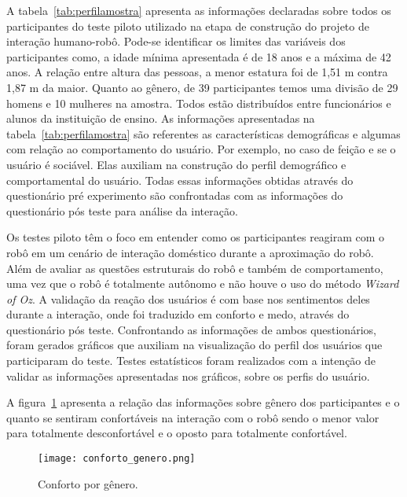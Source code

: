 A tabela~\ref{tab:perfilamostra} apresenta as informações declaradas sobre todos os participantes do teste piloto utilizado na etapa de construção do projeto de interação humano-robô. Pode-se identificar os limites das variáveis dos participantes como, a idade mínima apresentada é de 18 anos e a máxima de 42 anos. A relação entre altura das pessoas, a menor estatura foi de 1,51 m contra 1,87 m da maior. Quanto ao gênero, de 39 participantes temos uma divisão de 29 homens e 10 mulheres na amostra. Todos estão distribuídos entre funcionários e alunos da instituição de ensino. As informações apresentadas na tabela~\ref{tab:perfilamostra} são referentes as características demográficas e algumas com relação ao comportamento do usuário. Por exemplo, no caso de feição e se o usuário é sociável. Elas auxiliam na construção do perfil demográfico e comportamental do usuário. Todas essas informações obtidas através do questionário pré experimento são confrontadas com as informações do questionário pós teste para análise da interação.

Os testes piloto têm o foco em entender como os participantes reagiram com o robô em um cenário de interação doméstico durante a aproximação do robô. Além de avaliar as questões estruturais do robô e também de comportamento, uma vez que o robô é totalmente autônomo e não houve o uso do método \textit{Wizard of Oz}. A validação da reação dos usuários é com base nos sentimentos deles durante a interação, onde foi traduzido em conforto e medo, através do questionário pós teste. Confrontando as informações de ambos questionários, foram gerados gráficos que auxiliam na visualização do perfil dos usuários que participaram do teste. Testes estatísticos foram realizados com a intenção de validar as informações apresentadas nos gráficos, sobre os perfis do usuário.

A figura~\ref{fig:confortogenero} apresenta a relação das informações sobre gênero dos participantes e o quanto se sentiram confortáveis na interação com o robô sendo o menor valor para totalmente desconfortável e o oposto para totalmente confortável.

\begin{figure}[ht!]
	\centering
	\begin{minipage}{0.65\textwidth}
		\caption{Conforto por gênero.}
		\texttt{[image: conforto\_genero.png]}
		\label{fig:confortogenero}
	\end{minipage}
\end{figure}

